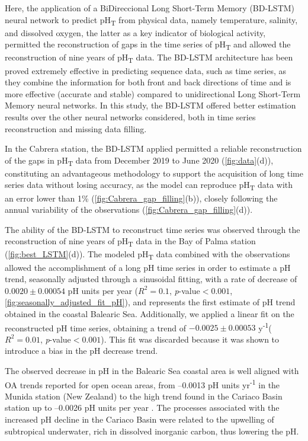 Here, the application of a BiDireccional Long Short-Term Memory (BD-LSTM)
neural network to predict pH\textsubscript{T} from physical data, namely
temperature, salinity, and dissolved oxygen, the latter as a key indicator of
biological activity, permitted the reconstruction of gaps in the time series of
pH\textsubscript{T} and allowed the reconstruction of nine years of
pH\textsubscript{T} data. The BD-LSTM architecture has been proved extremely
effective in predicting sequence data, such as time series, as they combine the
information for both front and back directions of time \cite{graves2005} and
is more effective (accurate and stable) compared to unidirectional Long
Short-Term Memory neural networks. In this study, the BD-LSTM offered
better estimation results over the other neural networks considered, both in
time series reconstruction and missing data filling.

In the Cabrera station, the BD-LSTM applied permitted a reliable
reconstruction of the gaps in pH\textsubscript{T} data from December 2019 to
June 2020 (\cref{fig:data}(d)), constituting an advantageous methodology to
support the acquisition of long time series data without losing accuracy, as
the model can reproduce pH\textsubscript{T} data with an error lower than 1\%
(\cref{fig:Cabrera_gap_filling}(b)), closely following the annual variability
of the observations (\cref{fig:Cabrera_gap_filling}(d)).

The ability of the BD-LSTM to reconstruct time series was observed through
the reconstruction of nine years of pH\textsubscript{T} data in the Bay of
Palma station (\cref{fig:best_LSTM}(d)). The modeled pH\textsubscript{T} data
combined with the observations allowed the accomplishment of a long pH time
series in order to estimate a pH trend, seasonally adjusted through a
sinusoidal fitting, with a rate of decrease of $0.0020\pm 0.00054$ pH units per
year ($R^2=0.1$, \emph{p}-value$<0.001$,
\cref{fig:seasonally_adjusted_fit_pH}), and represents the first estimate of pH
trend obtained in the coastal Balearic Sea. Additionally, we applied a linear
fit on the reconstructed pH time series, obtaining a trend of $-0.0025\pm
    0.00053$ y\textsuperscript{-1}($R^2=0.01$, \emph{p}-value$<0.001$). This
fit was discarded because it was shown to introduce a bias in the pH decrease
trend.

The observed decrease in pH in the Balearic Sea coastal area is well aligned
with OA trends reported for open ocean areas, from –0.0013 pH units
yr\textsuperscript{-1} in the Munida station (New Zealand) to the high trend
found in the Cariaco Basin station up to –0.0026 pH units per
year \cite{Bates2014}. The processes associated with the increased pH decline
in
the Cariaco Basin were related to the upwelling of subtropical underwater,
rich in dissolved inorganic carbon, thus lowering the pH.

